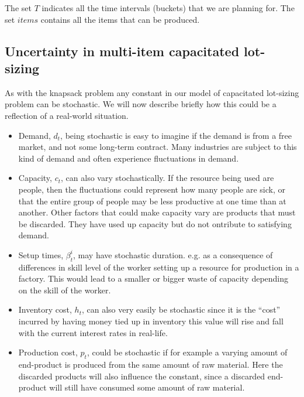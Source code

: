 The set $T$ indicates all the time intervals (buckets) that we are
planning for. The set $items$ contains all the items that can be produced.

\subsection{Uncertainty in multi-item capacitated lot-sizing}
As with the knapsack problem any constant in our model of capacitated
lot-sizing problem can be stochastic. We
will now describe briefly how this could be a reflection of a
real-world situation.

\begin{itemize}
\item Demand, $d_t$, being stochastic is easy to imagine if the demand
  is from a free market, and not some long-term contract. Many
  industries are subject to this kind of demand and often experience
  fluctuations in demand.
\item Capacity, $c_t$, can also vary stochastically. If the resource
  being used are people, then the fluctuations could represent how
  many people are sick, or that the entire group of people may be less
  productive at one time than at another. Other factors that could
  make capacity vary are products that must be discarded. They have
  used up capacity but do not ontribute to satisfying demand.
\item Setup times, $\beta^i _t$, may have stochastic duration. e.g. as
a consequence of differences in skill level of the worker setting up a
resource for production in a factory. This would lead to a smaller or
bigger waste of capacity depending on the skill of the worker.
\item Inventory cost, $h_t$, can also very easily be stochastic since
  it is the ``cost'' incurred by having money tied up in inventory
  this value will rise and fall with the current interest rates in
  real-life.
\item Production cost, $p_t$, could be stochastic if for example a
  varying amount of end-product is produced from the same amount of
  raw material. Here the discarded products will also influence the
  constant, since a discarded end-product will still have consumed some
  amount of raw material.
\end{itemize}

